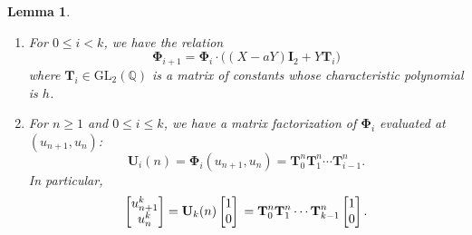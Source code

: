 \documentclass{article}
\numberwithin{equation}{section}
\newtheorem{lem}[thm]{Lemma}
\theoremstyle{definition}
\theoremstyle{remark}
\newcommand{\GL}{\mathrm{GL}}
\newcommand{\QQ}{\mathbb{Q}}
\newcommand{\<}{\left\langle}
\renewcommand{\>}{\right\rangle}
\begin{document}
\begin{lem}\label{lem:F}~
  \begin{enumerate}[label=\textup{(\alph*)}]
    \item\label{Phi:reln} For $0 \leq i < k$, we have the relation
    \begin{equation} \label{eq:Phi_reln}
      \boldsymbol{\Phi}_{i+1} = \boldsymbol{\Phi}_i \cdot \big((X - aY) \mathbf{I}_2 + Y \mathbf{T}_i\big)
    \end{equation}
    where $\mathbf{T}_i \in \GL_2(\QQ)$ is a matrix of constants whose characteristic polynomial is $h$.
    \item\label{Phi:fzn} For $n \geq 1$ and $0 \leq i \leq k$, we have a matrix factorization of $\boldsymbol{\Phi}_i$ evaluated at $(u_{n+1}, u_n)$:
    \begin{equation} \label{eq:Phi_fzn}
      \mathbf{U}_i(n) = \boldsymbol{\Phi}_i\left(u_{n+1}, u_n\right) = \mathbf{T}_0^n \mathbf{T}_1^n \cdots \mathbf{T}_{i-1}^n.
    \end{equation}
    In particular,
    \begin{equation} \label{eq:Phi_fzn_special}
      \begin{bmatrix}
        u_{n+1}^k \\ u_n^k
      \end{bmatrix} =
      \mathbf{U}_k(n) \begin{bmatrix}
        1 \\ 0
      \end{bmatrix} \\
      = \mathbf{T}_0^n \mathbf{T}_1^n \cdots \mathbf{T}_{k-1}^n \begin{bmatrix}
        1 \\ 0
      \end{bmatrix}.
    \end{equation}
  \end{enumerate}
\end{lem}
\end{document}

